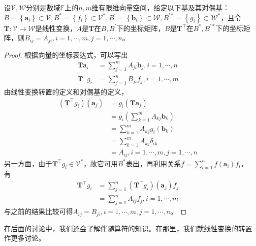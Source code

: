 \documentclass[main.tex]{subfiles}
\begin{document}
\begin{theorem}\label{thm:II.2.20}
    设$\mathcal{V},\mathcal{W}$分别是数域$\mathbb{F}$上的$n,m$维有限维向量空间，给定以下基及其对偶基：$B=\left\{\mathbf{a}_i\right\}\subset\mathcal{V},B^*=\left\{f_i\right\}\subset\mathcal{V}^*,B^\prime=\left\{\mathbf{b}_i\right\}\subset\mathcal{W},B^{\prime *}=\left\{g_i\right\}\subset\mathcal{W}^*$，且令$\mathbf{T}:\mathcal{V}\rightarrow\mathcal{W}$是线性变换，$A$是$\mathbf{T}$在$B,B^\prime$下的坐标矩阵，$B$是$\mathbf{T}^\intercal$在$B^*,B^{\prime *}$下的坐标矩阵，则$B_{ij}=A_{ji},i=1,\cdots,m,j=1,\cdots,n$。
\end{theorem}
\begin{proof}
    根据向量的坐标表达式，可以写出
    \begin{align*}
        \mathbf{Ta}_i            & =\sum_{j=1}^mA_{ji}\mathbf{b}_j,i=1,\cdots,n \\
        \mathbf{T}^\intercal g_i & =\sum_{j=1}^nB_{ji}f_j,i=1,\cdots,m
    \end{align*}
    由线性变换转置的定义和对偶基的定义，
    \begin{align*}
        \left(\mathbf{T}^\intercal g_i\right)\left(\mathbf{a}_j\right) & =g_i\left(\mathbf{Ta}_j\right)                    \\
                                                                       & =g_i\left(\sum_{k=1}^m A_{kj}\mathbf{b}_k\right)  \\
                                                                       & =\sum_{k=1}^m A_{kj} g_i\left(\mathbf{b}_k\right) \\
                                                                       & =\sum_{k=1}^mA_{kj}\delta_{ik}                    \\
                                                                       & =A_{ij},i=1,\cdots,m,j=1,\cdots,n
    \end{align*}
    另一方面，由于$\mathbf{T}^\intercal g_i\in\mathcal{V}^*$，故它可用$B^*$表出，再利用关系$f=\sum_{i=1}^nf\left(\mathbf{a}_i\right)f_i$，有
    \begin{align*}
        \mathbf{T}^\intercal g_i & =\sum_{j=1}^n\left(\mathbf{T}^\intercal g_i\right)\left(\mathbf{a}_j\right) f_j \\
                                 & =\sum_{j=1}^n A_{ij}f_j,i=1,\cdots,m
    \end{align*}
    与之前的结果比较可得$A_{ij}=B_{ji},i=1,\cdots,m,j=1,\cdots,n$。
\end{proof}

在后面的讨论中，我们还会了解伴随算符的知识。在那里，我们就线性变换的转置作更多讨论。
\end{document}
